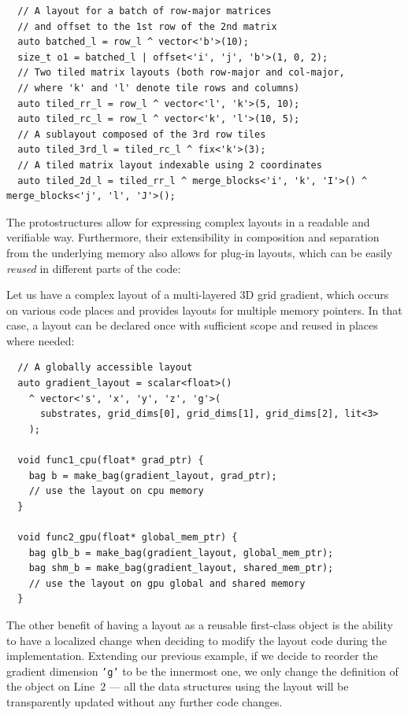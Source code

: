 \begin{verbatim}
  // A layout for a batch of row-major matrices
  // and offset to the 1st row of the 2nd matrix
  auto batched_l = row_l ^ vector<'b'>(10);
  size_t o1 = batched_l | offset<'i', 'j', 'b'>(1, 0, 2);
  // Two tiled matrix layouts (both row-major and col-major,
  // where 'k' and 'l' denote tile rows and columns)
  auto tiled_rr_l = row_l ^ vector<'l', 'k'>(5, 10);
  auto tiled_rc_l = row_l ^ vector<'k', 'l'>(10, 5);
  // A sublayout composed of the 3rd row tiles
  auto tiled_3rd_l = tiled_rc_l ^ fix<'k'>(3);
  // A tiled matrix layout indexable using 2 coordinates
  auto tiled_2d_l = tiled_rr_l ^ merge_blocks<'i', 'k', 'I'>() ^ merge_blocks<'j', 'l', 'J'>();
\end{verbatim}

The protostructures allow for expressing complex layouts in a readable and verifiable way. Furthermore, their extensibility in composition and separation from the underlying memory also allows for plug-in layouts, which can be easily \emph{reused} in different parts of the code:

Let us have a complex layout of a multi-layered 3D grid gradient, which occurs on various code places and provides layouts for multiple memory pointers. In that case, a layout can be declared once with sufficient scope and reused in places where needed:
\begin{verbatim}
  // A globally accessible layout
  auto gradient_layout = scalar<float>()
    ^ vector<'s', 'x', 'y', 'z', 'g'>(
      substrates, grid_dims[0], grid_dims[1], grid_dims[2], lit<3>
    );

  void func1_cpu(float* grad_ptr) {
    bag b = make_bag(gradient_layout, grad_ptr);
    // use the layout on cpu memory
  }

  void func2_gpu(float* global_mem_ptr) {
    bag glb_b = make_bag(gradient_layout, global_mem_ptr);
    bag shm_b = make_bag(gradient_layout, shared_mem_ptr);
    // use the layout on gpu global and shared memory
  }
\end{verbatim}

The other benefit of having a layout as a reusable first-class object is the ability to have a localized change when deciding to modify the layout code during the implementation. Extending our previous example, if we decide to reorder the gradient dimension \texttt{'g'} to be the innermost one, we only change the definition of the object on Line~$2$ --- all the data structures using the layout will be transparently updated without any further code changes.



